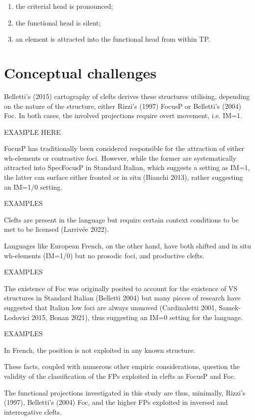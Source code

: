 \documentclass[fleqn,10pt]{wlscirep}
\begin{document}
\begin{enumerate}[i]
    \item the criterial head is pronounced; 
    \item the functional head is silent; 
    \item an element is attracted into the functional head from within TP. 
\end{enumerate}


\section*{Conceptual challenges}

Belletti’s (2015) cartography of clefts derives these structures utilising, depending on the nature of the structure, either Rizzi’s (1997) FocusP or Belletti’s (2004) Foc. 
In both cases, the involved projections require overt movement, i.e. IM=1.

EXAMPLE HERE

FocusP has traditionally been considered responsible for the attraction of either wh-elements or contrastive foci. 
However, while the former are systematically attracted into SpecFocusP in Standard Italian, which suggests a setting as IM=1, the latter can surface either fronted or in situ (Bianchi 2013), rather suggesting an IM=1/0 setting. 

EXAMPLES

Clefts are present in the language but require certain context conditions to be met to be licensed (Larrivée 2022). 

Languages like European French, on the other hand, have both shifted and in situ wh-elements (IM=1/0) but no prosodic foci, and productive clefts. 

EXAMPLES

The existence of Foc was originally posited to account for the existence of VS structures in Standard Italian (Belletti 2004) but many pieces of research have suggested that Italian low foci are always unmoved (Cardinaletti 2001, Samek-Lodovici 2015, Bonan 2021), thus suggesting an IM=0 setting for the language. 

EXAMPLES

In French, the position is not exploited in any known structure. 

These facts, coupled with numerous other empiric considerations, question the validity of the classification of the FPs exploited in clefts as FocusP and Foc. 

The functional projections investigated in this study are thus, minimally, Rizzi’s (1997), Belletti’s (2004) Foc, and the higher FPs exploited in inversed and interrogative clefts.
\end{document}
